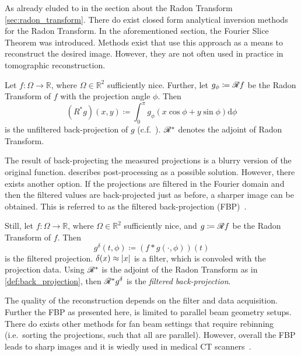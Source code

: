 As already eluded to in the section about the Radon Transform \ref{sec:radon_transform}. There do
exist closed form analytical inversion methods for the Radon Transform. In the aforementioned
section, the Fourier Slice Theorem was introduced. Methods exist that use this approach as a means
to reconstruct the desired image. However, they are not often used in practice in tomographic
reconstruction.

\begin{definition}\label{def:back_projection}
	Let \(f\colon \Omega \to \mathbb{R}\), where \(\Omega \in \mathbb{R}^2\) sufficiently nice.
	Further, let \(g_\phi \coloneq \mathscr{R} f\) be the Radon Transform of \(f\) with the
	projection angle \(\phi\). Then
	\[ (R^\ast g)(x, y) \coloneq \int_0^\pi g_\phi(x\cos \phi + y \sin\phi) \mathrm{d}\phi \]
	is the unfiltered back-projection of \(g\) (c.f.~\cite{buzug_computed_2008}).
	\(\mathscr{R}^\ast\) denotes the adjoint of Radon Transform.
\end{definition}


The result of back-projecting the measured projections is a blurry version of the original function.
\citeauthor{buzug_computed_2008} describes post-processing as a possible solution. However, there
exists another option. If the projections are filtered in the Fourier domain and then the filtered
values are back-projected just as before, a sharper image can be obtained. This is referred to as
the filtered back-projection (FBP)~\cite{ramachandran_three-dimensional_1971}.

\begin{definition}\label{def:filtered_back_projection}
	Still, let \(f\colon \Omega \to \mathbb{R}\), where \(\Omega \in \mathbb{R}^2\) sufficiently
	nice, and \(g \coloneq \mathscr{R} f\) be the Radon Transform of \(f\). Then
	\[ g^\delta(t, \phi) \coloneq (f \ast g(\cdot, \phi))(t) \]
	is the filtered projection. \(\delta(x) \approx \lvert x\rvert\) is a filter, which is convoled
	with the projection data. Using \(\mathscr{R}^\ast\) is the adjoint of the Radon Transform
	as in \autoref{def:back_projection}, then \(\mathscr{R}^\ast g^\delta\) is the
	\textit{filtered back-projection}.
\end{definition}

The quality of the reconstruction depends on the filter and data acquisition. Further the FBP as
presented here, is limited to parallel beam geometry setups. There do exists other methods for fan
beam settings that require rebinning (i.e.\ sorting the projections, such that all are parallel).
However, overall the FBP leads to sharp images and it is wiedly used in medical CT
scanners~\cite{pan_why_2009}.

